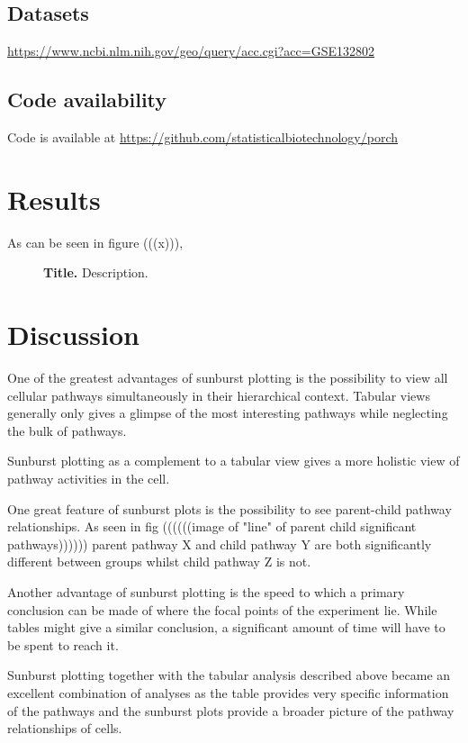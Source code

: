 \documentclass[11pt]{article}
\renewcommand{\includegraphics}[2][]{}
\begin{document}
\subsection*{Datasets}
  \url{https://www.ncbi.nlm.nih.gov/geo/query/acc.cgi?acc=GSE132802}
\subsection*{Code availability}
  Code is available at \url{https://github.com/statisticalbiotechnology/porch}

\section*{Results}


  As can be seen in figure (((x))),


\begin{figure}[htp]
\begin{center}
\caption{\label{fig:id-stats} {\bf Title.} Description.}
\end{center}
\end{figure}

\section*{Discussion}
  One of the greatest advantages of sunburst plotting is the possibility to view all cellular pathways simultaneously in their hierarchical context. Tabular views generally only gives a glimpse of the most interesting pathways while neglecting the bulk of pathways.

  Sunburst plotting as a complement to a tabular view gives a more holistic view of pathway activities in the cell.

  One great feature of sunburst plots is the possibility to see parent-child pathway relationships. As seen in fig  ((((((image of "line" of parent child significant pathways)))))) parent pathway X and child pathway Y are both significantly different between groups whilst child pathway Z is not.


  Another advantage of sunburst plotting is the speed to which a primary conclusion can be made of where the focal points of the experiment lie. While tables might give a similar conclusion, a significant amount of time will have to be spent to reach it.

  Sunburst plotting together with the tabular analysis described above became an excellent combination of analyses as the table provides very specific information of the pathways and the sunburst plots provide a broader picture of the pathway relationships of cells.
\end{document}
